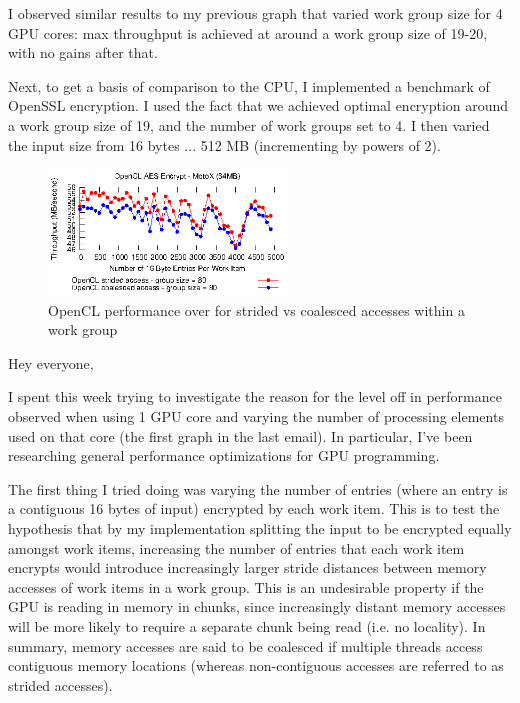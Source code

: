 \documentclass[conference,10pt]{IEEEtran}
\begin{document}
I observed similar results to my previous graph that varied work group size for 4 GPU cores: max 
throughput is achieved at around a work group size of 19-20, with no gains after that.

Next, to get a basis of comparison to the CPU, I implemented a benchmark of OpenSSL encryption.  I 
used the fact that we achieved optimal encryption around a work group size of 19, and the number of 
work groups set to 4.  I then varied the input size from 16 bytes ... 512 MB (incrementing by powers 
of 2).


\begin{figure}[!t]
\centering
\includegraphics[width=2.5in]{../final/motox/4.2/sample_opencl_aes_entries.64MB.4_work_groups.5000_max_entries.both.eps}
\caption{OpenCL performance over for strided vs coalesced accesses within a work group}
\label{fig:global_worksize}
\end{figure}

Hey everyone,

I spent this week trying to investigate the reason for the level off in performance observed when 
using 1 GPU core and varying the number of processing elements used on that core (the first graph in 
the last email).  In particular, I've been researching general performance optimizations for GPU 
programming. 

The first thing I tried doing was varying the number of entries (where an entry is a contiguous 16 
bytes of input) encrypted by each work item.  This is to test the hypothesis that by my 
implementation splitting the input to be encrypted equally amongst work items, increasing the number 
of entries that each work item encrypts would introduce increasingly larger stride distances between 
memory accesses of work items in a work group.  This is an undesirable property if the GPU is 
reading in memory in chunks, since increasingly distant memory accesses will be more likely to 
require a separate chunk being read (i.e. no locality).  In summary, memory accesses are said to be 
coalesced if multiple threads access contiguous memory locations (whereas non-contiguous accesses 
are referred to as strided accesses).
\end{document}
